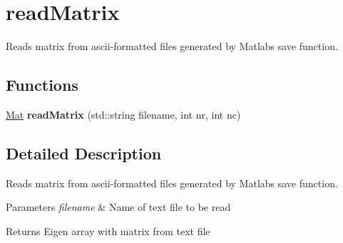 \hypertarget{group__readMatrix}{}\section{read\+Matrix}
\label{group__readMatrix}


Reads matrix from ascii-\/formatted files generated by Matlab\textquotesingle{}s \textquotesingle{}save\textquotesingle{} function.  


\subsection*{Functions}
\begin{DoxyCompactItemize}
\item 
\mbox{\label{group__readMatrix_gab4929a29168c19ae6815ddf6a062a407}} 
\mbox{\hyperlink{aux_8h_aa1fe91b8cd36c618282eb0d548690c4c}{Mat}} {\bfseries read\+Matrix} (std\+::string filename, int nr, int nc)
\end{DoxyCompactItemize}


\subsection{Detailed Description}
Reads matrix from ascii-\/formatted files generated by Matlab\textquotesingle{}s \textquotesingle{}save\textquotesingle{} function. 


\begin{DoxyParams}{Parameters}
{\em filename} & Name of text file to be read \\
\hline
\end{DoxyParams}
\begin{DoxyReturn}{Returns}
Eigen array with matrix from text file 
\end{DoxyReturn}
